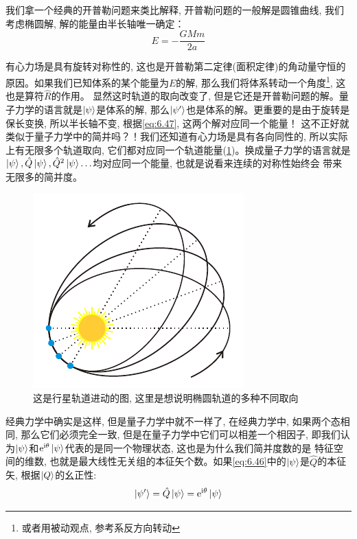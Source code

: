 \documentclass[a4paper,zihao=-4,linespread=1]{ctexrep}
\begin{document}
    我们拿一个经典的开普勒问题来类比解释, 开普勒问题的一般解是圆锥曲线, 我们考虑椭圆解, 解的能量由半长轴唯一确定：
    \begin{equation}
        \label{eq:6.47}
        E=-\frac{GMm}{2a}
    \end{equation}
    
    有心力场是具有旋转对称性的, 这也是开普勒第二定律(面积定律)的角动量守恒的原因。如果我们已知体系的某个能量为$E$的解, 那么我们将体系转动一个角度\footnote{或者用被动观点, 参考系反方向转动}, 这也是算符$\hat{R}$的作用。
    显然这时轨道的取向改变了, 但是它还是开普勒问题的解。量子力学的语言就是$\ket{\psi}$是体系的解, 那么$\ket{\psi^\prime}$也是体系的解。更重要的是由于旋转是保长变换, 所以半长轴不变, 根据\ref{eq:6.47}, 这两个解对应同一个能量！
    这不正好就类似于量子力学中的简并吗？！我们还知道有心力场是具有各向同性的, 所以实际上有无限多个轨道取向, 它们都对应同一个轨道能量(\ref{fig:6.4})。换成量子力学的语言就是$\ket{\psi},\hat{Q}\ket{\psi},\hat{Q}^2\ket{\psi}\ldots$均对应同一个能量, 也就是说看来连续的对称性始终会
    带来无限多的简并度。

    \begin{figure}[htbp]
        \centering
        \includegraphics[scale=1.2]{fig/6-4.pdf}
        \caption{这是行星轨道进动的图, 这里是想说明椭圆轨道的多种不同取向}
        \label{fig:6.4}
    \end{figure}   

    经典力学中确实是这样, 但是量子力学中就不一样了, 在经典力学中, 如果两个态相同, 那么它们必须完全一致, 但是在量子力学中它们可以相差一个相因子, 即我们认为$\ket{\psi}$和$\mathrm e^{\mathrm{i}\theta}\ket{\psi}$代表的是同一个物理状态, 这也是为什么我们简并度数的是
    特征空间的维数, 也就是最大线性无关组的本征矢个数。如果\ref{eq:6.46}中的$\ket{\psi}$是$\hat{Q}$的本征矢, 根据$\ket{Q}$的幺正性:
    \begin{equation}
        \ket{\psi^\prime}=\hat{Q}\ket{\psi}=\mathrm e^{\mathrm{i}\theta}\ket{\psi}
    \end{equation}
\end{document}
